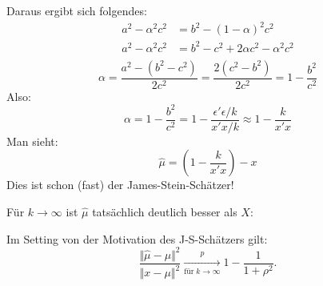 \documentclass[10pt]{article}
\newcommand{\KW}{\overset{p} \longrightarrow} %
\begin{document}
	Daraus ergibt sich folgendes: 
	\begin{equation*}
		\begin{split}
			a^2 - \alpha^2 c^2 &= b^2 - (1-\alpha)^2 c^2\\
			a^2 -\alpha^2 c^2 &= b^2 - c^2 + 2 \alpha c^2 - \alpha^2 c^2 \\
		\end{split}
	\end{equation*}
	\begin{equation*}
		\alpha = \frac{a^2-(b^2-c^2)}{2c^2} = \frac{2(c^2-b^2)}{2c^2} = 1-\frac{b^2}{c^2}
	\end{equation*}
	Also:
	\begin{equation*}
		\alpha = 1-\frac{b^2}{c^2} = 1-\frac{\epsilon' \epsilon / k}{x'x/k} \approx 1-\frac{k}{x'x}
	\end{equation*}
	Man sieht:
	\begin{equation*}
		\hat{\mu}= \left(1- \frac{k}{x'x}\right)-x
	\end{equation*}
	Dies ist schon (fast) der James-Stein-Schätzer!
	
	Für $k \rightarrow \infty$ ist $\hat{\mu}$ tatsächlich deutlich besser als $X$:
	
	\begin{Proposition}[Proposition 1.5.2]
		Im Setting von der Motivation des J-S-Schätzers gilt:
		\begin{equation*}
			\frac{\Vert \hat{\mu} - \mu \Vert^2}{\Vert x - \mu \Vert^2} \underset{\text{für} \; k \rightarrow \infty} {\KW} 1 - \frac{1}{1+ \rho^2}.
		\end{equation*}
	\end{Proposition}
	
\end{document}
